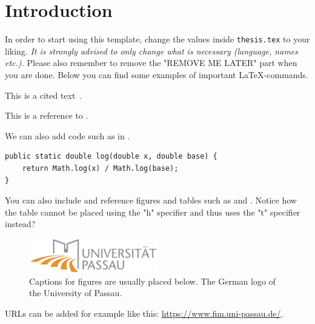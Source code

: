 

\chapter{Introduction}
\label{chapter:introduction}

In order to start using this template, change the values inside \texttt{thesis.tex} to your liking. \emph{It is strongly advised to only change what is necessary (language, names etc.).} Please also remember to remove the "REMOVE ME LATER" part when you are done. Below you can find some examples of important \LaTeX-commands.

This is a cited text~\cite{taubmann2016CloudPhylactor}.


This is a reference to .

We can also add code such as in .

\begin{code}
    \label{lst:log}
    \begin{verbatim}
public static double log(double x, double base) {
    return Math.log(x) / Math.log(base);
}
    \end{verbatim}
\end{code}

You can also include and reference figures and tables such as  and . Notice how the table cannot be placed using the "h" specifier and thus uses the "t" specifier instead?

\begin{figure}[ht!]
    \centering
    \includegraphics[width=0.5\textwidth]{img/logouni.png}
    \caption{Captions for figures are usually placed below. The German logo of the University of Passau.}
    \label{fig:test}
\end{figure}

URLs can be added for example like this: \url{https://www.fim.uni-passau.de/}.

